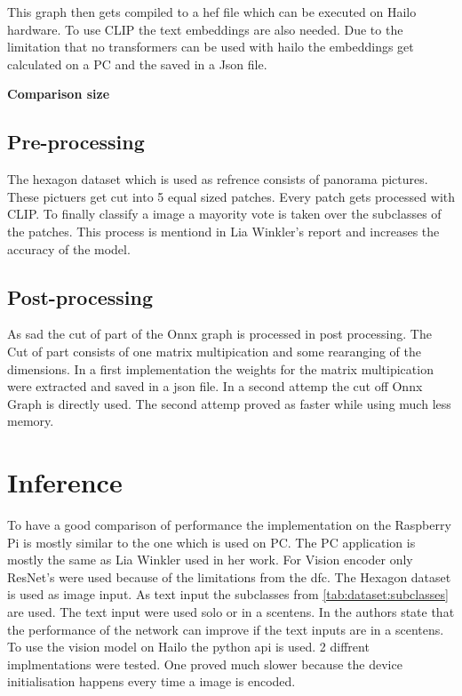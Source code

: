 This graph then gets compiled to a \acrshort{hef} file which can be executed on Hailo hardware.
To use CLIP the text embeddings are also needed.
Due to the limitation that no transformers can be used with hailo the embeddings get calculated on a PC and the saved in a Json file.

\textbf{Comparison size}


\subsection{Pre-processing}

The hexagon dataset which is used as refrence consists of panorama pictures.
These pictuers get cut into 5 equal sized patches.
Every patch gets processed with CLIP.
To finally classify a image a mayority vote is taken over the subclasses of the patches.
This process is mentiond in Lia Winkler's report and increases the accuracy of the model.

\subsection{Post-processing}

As sad the cut of part of the Onnx graph is processed in post processing.
The Cut of part consists of one matrix multipication and some rearanging of the dimensions.
In a first implementation the weights for the matrix multipication were extracted and saved in a json file.
In a second attemp the cut off Onnx Graph is directly used.
The second attemp proved as faster while using much less memory.

\section{Inference}
To have a good comparison of performance the implementation on the Raspberry Pi is mostly similar to the one which is used on PC.
The PC application is mostly the same as Lia Winkler used in her work.
For Vision encoder only ResNet's were used because of the limitations from the \acrshort{dfc}.
The Hexagon dataset is used as image input.
As text input the subclasses from \cref{tab:dataset:subclasses} are used.
The text input were used solo or in a scentens.
In \cite{clip} the authors state that the performance of the network can improve if the text inputs are in a scentens.
To use the vision model on Hailo the python api is used.
2 diffrent implmentations were tested.
One proved much slower because the device initialisation happens every time a image is encoded.


